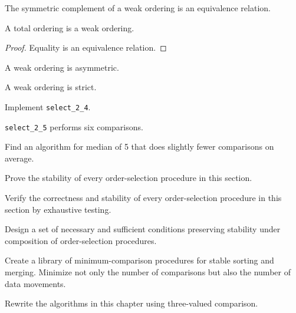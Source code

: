\begin{lemma}
	The symmetric complement of a weak ordering is an equivalence relation.
\end{lemma}

\begin{lemma}
	A total ordering is a weak ordering.
\end{lemma}

\begin{proof}
	Equality is an equivalence relation.
\end{proof}

\begin{lemma}
	A weak ordering is asymmetric.
\end{lemma}

\begin{lemma}
	A weak ordering is strict.
\end{lemma}

\begin{exercise}
	Implement \verb|select_2_4|.
\end{exercise}

\begin{lemma}
	\verb|select_2_5| performs six comparisons.
\end{lemma}

\begin{exercise}
	Find an algorithm for median of 5 that does slightly fewer comparisons
	on average.
\end{exercise}

\begin{exercise}
	Prove the stability of every order-selection procedure in this
	section.
\end{exercise}

\begin{exercise}
	Verify the correctness and stability of every order-selection
	procedure in this section by exhaustive testing.
\end{exercise}

\begin{project}
	Design a set of necessary and sufficient conditions preserving
	stability under composition of order-selection procedures.
\end{project}

\begin{project}
	Create a library of minimum-comparison procedures for stable
	sorting and merging. Minimize not only the number of comparisons
	but also the number of data movements.
\end{project}

\begin{exercise}
	Rewrite the algorithms in this chapter using three-valued
	comparison.
\end{exercise}
